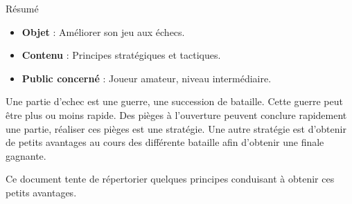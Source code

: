 \begin{center}
\Large
Résumé
\normalsize
\end{center}
\vspace{3cm}
\begin{itemize}[leftmargin=1cm, label=, itemsep=21pt]
\item {\bf Objet} : Améliorer son jeu aux échecs.
\item {\bf Contenu} : Principes stratégiques et tactiques.
\item {\bf Public concerné} : Joueur amateur, niveau intermédiaire.
\end{itemize}

\vspace{3cm}

Une partie d'echec est une guerre, une succession de bataille. Cette guerre peut être plus ou moins rapide.
Des pièges à l'ouverture peuvent conclure rapidement une partie, réaliser ces pièges est une stratégie.
Une autre stratégie est d'obtenir de petits avantages au cours des différente bataille afin d'obtenir une finale gagnante.

Ce document tente de répertorier quelques principes conduisant à obtenir ces petits avantages. 


\vspace{3cm}


